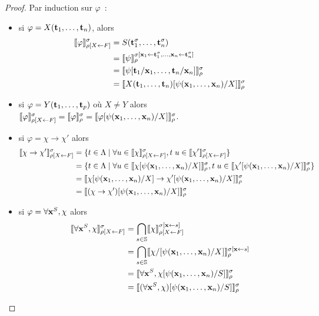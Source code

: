 \documentclass{article}
\begin{document}
\begin{proof}
  Par induction sur $\varphi$~:
  \begin{itemize}
  \item si $\varphi = X(\mathbf{t}_1,\ldots,\mathbf{t}_n)$, alors
    \begin{align*}
      \llbracket \varphi \rrbracket_{\rho[X\leftarrow F]}^\sigma &= S(\mathbf{t}_1^\sigma,\ldots,\mathbf{t}_n^\sigma) \\
      &= \llbracket \psi \rrbracket_\rho^{\sigma[\mathbf{x}_1\leftarrow \mathbf{t}_1^\sigma,\ldots,\mathbf{x}_n\leftarrow \mathbf{t}_n^\sigma]} \\
      &= \llbracket \psi[\mathbf{t}_1/\mathbf{x}_1,\ldots,\mathbf{t}_n/\mathbf{x}_n] \rrbracket_\rho^\sigma\\
      &= \llbracket X(\mathbf{t}_1,\ldots,\mathbf{t}_n)[\psi(\mathbf{x}_1,\ldots,\mathbf{x}_n)/X] \rrbracket_\rho^\sigma
    \end{align*}
  \item si $\varphi = Y(\mathbf{t}_1,\ldots,\mathbf{t}_p)$ où $X\neq Y$ alors $\llbracket \varphi \rrbracket_{\rho[X\leftarrow F]}^\sigma = \llbracket \varphi \rrbracket_\rho^\sigma = \llbracket \varphi[\psi(\mathbf{x}_1,\ldots,\mathbf{x}_n)/X] \rrbracket_\rho^\sigma$.
  \item si $\varphi = \chi \to \chi'$ alors
    \begin{align*}
      \llbracket \chi\to\chi' \rrbracket_{\rho[X\leftarrow F]}^\sigma &= \{t\in\Lambda\mid \forall u \in \llbracket \chi \rrbracket_{\rho[X\leftarrow F]}^\sigma, t\;u\in \llbracket \chi' \rrbracket_{\rho[X\leftarrow F]}^\sigma\}\\
      &= \{t\in\Lambda\mid \forall u \in \llbracket \chi[\psi(\mathbf{x}_1,\ldots,\mathbf{x}_n)/X] \rrbracket_\rho^\sigma, t\;u\in\llbracket \chi'[\psi(\mathbf{x}_1,\ldots,\mathbf{x}_n)/X] \rrbracket_\rho^\sigma\}\\
      &= \llbracket \chi[\psi(\mathbf{x}_1,\ldots,\mathbf{x}_n)/X] \to \chi'[\psi(\mathbf{x}_1,\ldots,\mathbf{x}_n)/X] \rrbracket_\rho^\sigma\\
      &= \llbracket (\chi\to\chi')[\psi(\mathbf{x}_1,\ldots,\mathbf{x}_n)/X] \rrbracket_\rho^\sigma
    \end{align*}
  \item si $\varphi = \forall \mathbf{x}^S, \chi$ alors
    \begin{align*}
      \llbracket \forall \mathbf{x}^S, \chi \rrbracket_{\rho[X\leftarrow F]}^\sigma &= \bigcap_{s\in\mathbb{S}}\llbracket \chi \rrbracket_{\rho[X\leftarrow F]}^{\sigma[\mathbf{x}\leftarrow s]}\\
      &= \bigcap_{s\in\mathbb{S}}\llbracket \chi/[\psi(\mathbf{x}_1,\ldots,\mathbf{x}_n)/X] \rrbracket_\rho^{\sigma[\mathbf{x}\leftarrow s]}\\
      &= \llbracket \forall \mathbf{x}^S, \chi[\psi(\mathbf{x}_1,\ldots,\mathbf{x}_n)/S] \rrbracket_\rho^\sigma\\
      &= \llbracket (\forall \mathbf{x}^S, \chi)[\psi(\mathbf{x}_1,\ldots,\mathbf{x}_n)/S] \rrbracket_\rho^\sigma
    \end{align*}

\end{itemize}
\end{proof}
\end{document}
